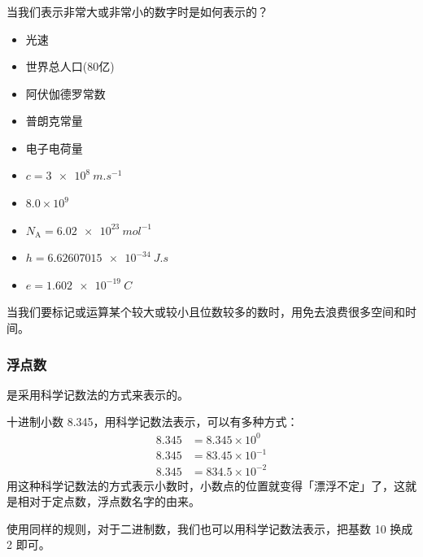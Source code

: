 \begin{frame}[t]
    \frametitle{}
    \begin{question}
        当我们表示非常大或非常小的数字时是如何表示的？
    \end{question}

    \bigskip
    \begin{minipage}{0.28\linewidth}
    \begin{itemize}
        \item 光速
        \item 世界总人口(80亿)
        \item 阿伏伽德罗常数
        \item 普朗克常量
        \item 电子电荷量
      \end{itemize}
    \end{minipage}\hfill \pause
    \begin{minipage}{0.68\linewidth}
    \begin{itemize}
        \item $c= \SI{3e8}{m.s^{-1}}$
        \item $8.0 \times 10^9$
        \item $N_\mathrm{A} = \SI{6.02e23}{mol^{-1}}$
        \item $h=\SI{6.62607015e-34}{J.s}$
        \item $e=\SI{1.602e-19}{C}$
      \end{itemize}
    \end{minipage}

    \bigskip
    \qquad 当我们要标记或运算某个较大或较小且位数较多的数时，用免去浪费很多空间和时间。
\end{frame}


\begin{frame}
    \frametitle{浮点数}
    是采用科学记数法的方式来表示的。

    十进制小数 8.345，用科学记数法表示，可以有多种方式：
    \begin{align*}
    8.345 &= 8.345 \times 10^0 \\
    8.345 &= 83.45 \times 10^{-1} \\
    8.345 &= 834.5 \times 10^{-2}
    \end{align*}
    用这种科学记数法的方式表示小数时，小数点的位置就变得「漂浮不定」了，这就是相对于定点数，浮点数名字的由来。

    使用同样的规则，对于二进制数，我们也可以用科学记数法表示，把基数 10 换成 2 即可。
\end{frame}

